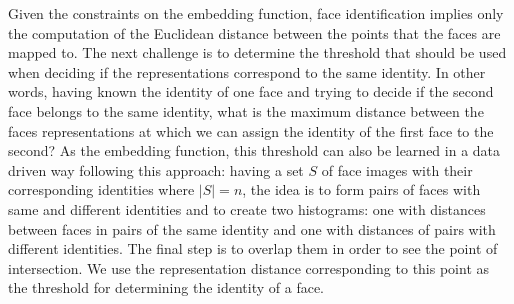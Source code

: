 Given the constraints on the embedding function, face identification implies only the computation of the Euclidean distance between the points that the faces are mapped to. The next challenge is to determine the threshold that should be used when deciding if the representations correspond to the same identity. 
In other words, having known the identity of one face and trying to decide if the second face belongs to the same identity, what is the maximum distance between the faces representations at which we can assign the identity of the first face to the second? As the embedding function, this threshold can also be learned in a data driven way following this approach: having a set $S$ of face images with their corresponding identities where $|S| = n$, the idea is to form pairs of faces with same and different identities and to create two histograms: one with distances between faces in pairs of the same identity and one with distances of pairs with different identities. The final step is to overlap them in order to see the point of intersection. We use the representation distance corresponding to this point as the threshold for determining the identity of a face.

